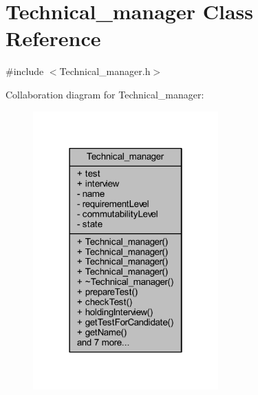 \hypertarget{class_technical__manager}{}\section{Technical\+\_\+manager Class Reference}
\label{class_technical__manager}


{\ttfamily \#include $<$Technical\+\_\+manager.\+h$>$}



Collaboration diagram for Technical\+\_\+manager\+:
\nopagebreak
\begin{figure}[H]
\begin{center}
\leavevmode
\includegraphics[width=202pt]{class_technical__manager__coll__graph}
\end{center}
\end{figure}
